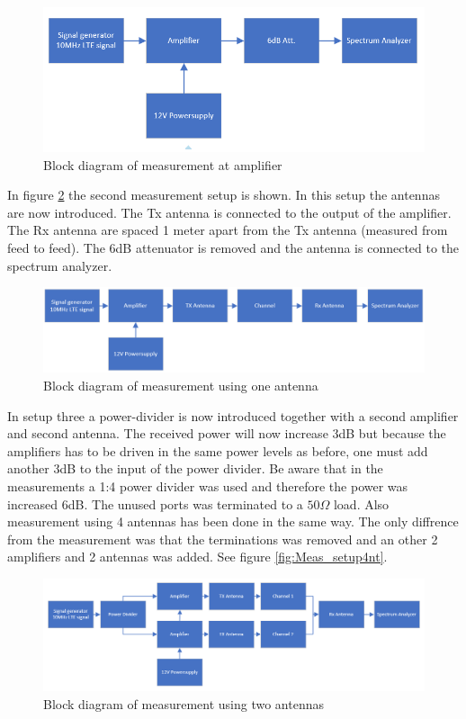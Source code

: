 \begin{figure}[H]
\centering 
\includegraphics[scale = 0.6]{figures/measurement/meas_set_1.png}
\caption{Block diagram of measurement at amplifier }
\label{fig:Meas_setup1}
\end{figure} 

In figure \ref{fig:Meas_setup2} the second measurement setup is shown. In this setup the antennas are now introduced. The Tx antenna is connected to the output of the amplifier. The Rx antenna are spaced 1 meter apart from the Tx antenna (measured from feed to feed). The 6dB attenuator is removed and the antenna is connected to the spectrum analyzer. 


\begin{figure}[H]
\centering 
\includegraphics[scale = 0.6]{figures/measurement/meas_set_2.png}
\caption{Block diagram of measurement using one antenna}
\label{fig:Meas_setup2}
\end{figure} 

In setup three a power-divider is now introduced together with a second amplifier and second antenna. The received power will now increase 3dB but because the amplifiers has to be driven in the same power levels as before, one must add another 3dB to the input of the power divider. Be aware that in the measurements a 1:4 power divider was used and therefore the power was increased 6dB. The unused ports was terminated to a $50\Omega$ load. Also measurement using 4 antennas has been done in the same way. The only diffrence from the measurement was that the terminations was removed and an other 2 amplifiers and 2 antennas was added. See figure \ref{fig:Meas_setup4nt}.

\begin{figure}[H]
\centering 
\includegraphics[scale = 0.6]{figures/measurement/meas_set_3.png}
\caption{Block diagram of measurement using two antennas}
\label{fig:Meas_setup3}
\end{figure} 


